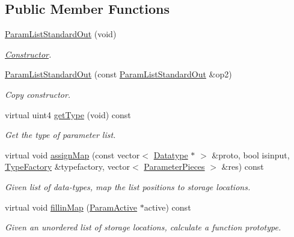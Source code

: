 \subsection*{Public Member Functions}
\begin{DoxyCompactItemize}
\item 
\mbox{\hyperlink{class_param_list_standard_out_aab54e2b42115e402ac062b4c774ff960}{Param\+List\+Standard\+Out}} (void)
\begin{DoxyCompactList}\small\item\em \mbox{\hyperlink{class_constructor}{Constructor}}. \end{DoxyCompactList}\item 
\mbox{\hyperlink{class_param_list_standard_out_a3dabd4d3d1aaf7c4690ec3c45e8a6392}{Param\+List\+Standard\+Out}} (const \mbox{\hyperlink{class_param_list_standard_out}{Param\+List\+Standard\+Out}} \&op2)
\begin{DoxyCompactList}\small\item\em Copy constructor. \end{DoxyCompactList}\item 
virtual uint4 \mbox{\hyperlink{class_param_list_standard_out_a8d0f947ba2b94e2921712114d986f74f}{get\+Type}} (void) const
\begin{DoxyCompactList}\small\item\em Get the type of parameter list. \end{DoxyCompactList}\item 
virtual void \mbox{\hyperlink{class_param_list_standard_out_af50fd192a944d885223b263e5c31a69e}{assign\+Map}} (const vector$<$ \mbox{\hyperlink{class_datatype}{Datatype}} $\ast$ $>$ \&proto, bool isinput, \mbox{\hyperlink{class_type_factory}{Type\+Factory}} \&typefactory, vector$<$ \mbox{\hyperlink{struct_parameter_pieces}{Parameter\+Pieces}} $>$ \&res) const
\begin{DoxyCompactList}\small\item\em Given list of data-\/types, map the list positions to storage locations. \end{DoxyCompactList}\item 
virtual void \mbox{\hyperlink{class_param_list_standard_out_aab2d6055785c4e98b3a8c4e1b70f86be}{fillin\+Map}} (\mbox{\hyperlink{class_param_active}{Param\+Active}} $\ast$active) const
\begin{DoxyCompactList}\small\item\em Given an unordered list of storage locations, calculate a function prototype. \end{DoxyCompactList}\item 

\end{DoxyCompactItemize}
